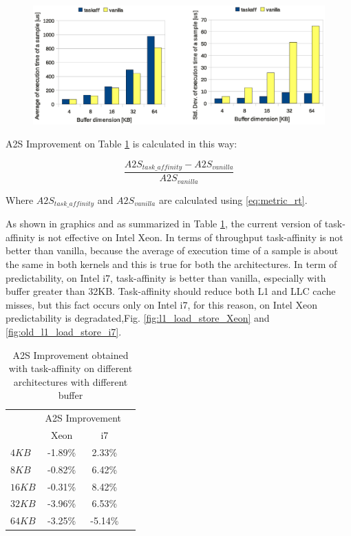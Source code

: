 \newpage

\begin{figure}[htbp]
\centering
\includegraphics[width=\widefigure]{images/time/time_avg_var_i7.eps}
\caption{}
\label{fig:avg_var_i7}
\end{figure}

A2S Improvement on Table \ref{tab:speedup_xeon_i7} is calculated in this way:

\begin{equation}
        \frac{A2S_{task\_affinity} - A2S_{vanilla}}{A2S_{vanilla}}
\label{eq:miss_rate}
\end{equation}

Where $A2S_{task\_affinity}$ and $A2S_{vanilla}$ are calculated using \ref{eq:metric_rt}.

As shown in graphics and as summarized in Table \ref{tab:speedup_xeon_i7}, the current version of task-affinity is not effective on Intel Xeon.
In terms of throughput task-affinity is not better than vanilla, because the average of execution time of a sample is about the same in both kernels 
and this is true for both the architectures. In term of predictability, on Intel i7, task-affinity is better than vanilla, especially with buffer 
greater than 32KB. Task-affinity should reduce both L1 and LLC cache misses, but this fact occurs only on Intel i7, for this reason, on Intel Xeon 
predictability is degradated,Fig. \ref{fig:l1_load_store_Xeon} and \ref{fig:old_l1_load_store_i7}. 


\begin{table}[htbp]
\begin{center}
\begin{tabular}{|l|c|c|c|}
	\hline
	       & \multicolumn{2}{|c|}{A2S Improvement} \\ 
	       & Xeon    & i7     \\ \hline
	$4KB$  & -1.89\% & 2.33\% \\ \hline
	$8KB$  & -0.82\% & 6.42\% \\ \hline
	$16KB$ & -0.31\% & 8.42\% \\ \hline
	$32KB$ & -3.96\% & 6.53\% \\ \hline
	$64KB$ & -3.25\% & -5.14\% \\ \hline
\end{tabular}
\caption{A2S Improvement obtained with task-affinity on different architectures with different buffer}
\label{tab:speedup_xeon_i7}
\end{center}
\end{table}

